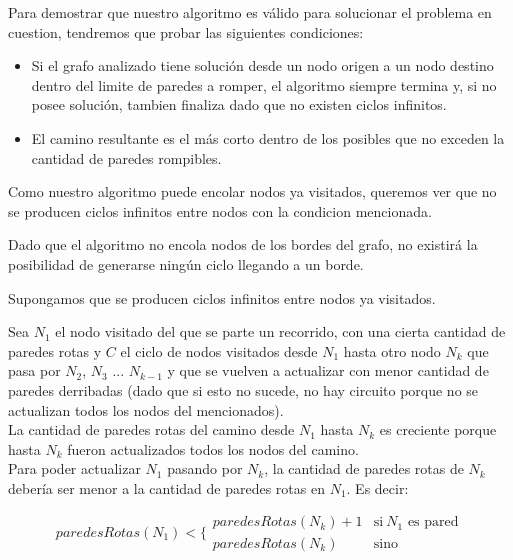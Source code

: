Para demostrar que nuestro algoritmo es válido para solucionar el problema en cuestion, tendremos que probar las siguientes condiciones:\\

\begin{itemize}
\item Si el grafo analizado tiene solución desde un nodo origen a un nodo destino dentro del limite de paredes a romper, el algoritmo siempre termina y, si no posee solución, tambien finaliza dado que no existen ciclos infinitos.
\item El camino resultante es el m\'as corto dentro de los posibles que no exceden la cantidad de paredes rompibles.
\end{itemize}

Como nuestro algoritmo puede encolar nodos ya visitados, queremos ver que no se producen ciclos infinitos entre nodos con la condicion mencionada.

Dado que el algoritmo no encola nodos de los bordes del grafo, no existirá la posibilidad de generarse ningún ciclo llegando a un borde.

Supongamos que se producen ciclos infinitos entre nodos ya visitados. 

Sea $N_1$ el nodo visitado del que se parte un recorrido, con una cierta cantidad de paredes rotas y $C$ el ciclo de nodos visitados desde $N_1$ hasta otro nodo  $N_k$  que pasa por $N_2$, $N_3$ ... $N_{k-1}$ y que se vuelven a actualizar con menor cantidad de paredes derribadas (dado que si esto no sucede, no hay circuito porque no se actualizan todos los nodos del mencionados).\\
 
La cantidad de paredes rotas del camino desde $N_1$ hasta $N_k$ es creciente porque hasta $N_k$ fueron actualizados todos los nodos del camino.\\

Para poder actualizar $N_1$ pasando por $N_k$, la cantidad de paredes rotas de $N_k$ debería ser menor a la cantidad de paredes rotas en $N_1$. Es decir:

\begin{equation}
paredesRotas(N_1) <
\Bigg \{
\begin{matrix} 
paredesRotas(N_k) + 1 & \mathrm{si\ } N_1 \text{$\text{ es pared}$} \\
paredesRotas(N_k)  & \mathrm{si no\ }
\end{matrix}
\end{equation}

